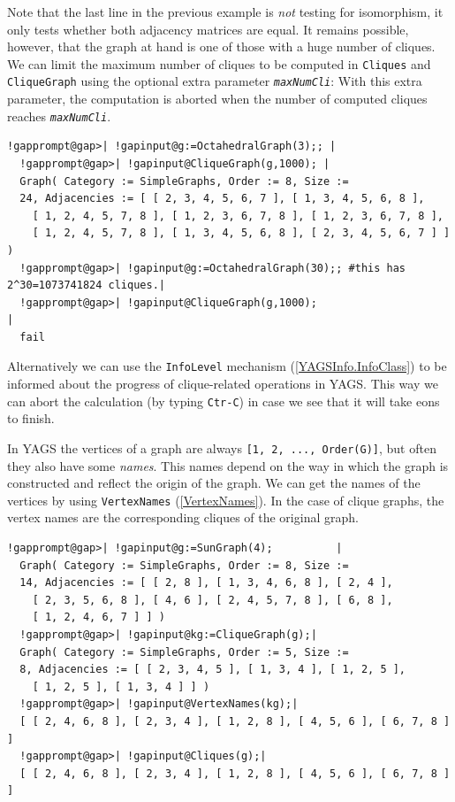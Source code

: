 \documentclass[a4paper,11pt]{report}
\begin{document}
{{Note that the last line in the previous example is \emph{not} testing for isomorphism, it only tests whether both adjacency matrices are
equal. It remains possible, however, that the graph at hand is one of those
with a huge number of cliques. We can limit the maximum number of cliques to
be computed in \texttt{Cliques} and \texttt{CliqueGraph} using the optional extra parameter \mbox{\texttt{\mdseries\slshape maxNumCli}}: With this extra parameter, the computation is aborted when the number of
computed cliques reaches \mbox{\texttt{\mdseries\slshape maxNumCli}}. 

 
\begin{Verbatim}[commandchars=!@|,fontsize=\small,frame=single,label=Example]
  !gapprompt@gap>| !gapinput@g:=OctahedralGraph(3);; |
  !gapprompt@gap>| !gapinput@CliqueGraph(g,1000); |
  Graph( Category := SimpleGraphs, Order := 8, Size := 
  24, Adjacencies := [ [ 2, 3, 4, 5, 6, 7 ], [ 1, 3, 4, 5, 6, 8 ], 
    [ 1, 2, 4, 5, 7, 8 ], [ 1, 2, 3, 6, 7, 8 ], [ 1, 2, 3, 6, 7, 8 ], 
    [ 1, 2, 4, 5, 7, 8 ], [ 1, 3, 4, 5, 6, 8 ], [ 2, 3, 4, 5, 6, 7 ] ] )
  !gapprompt@gap>| !gapinput@g:=OctahedralGraph(30);; #this has 2^30=1073741824 cliques.|
  !gapprompt@gap>| !gapinput@CliqueGraph(g,1000);                            |
  fail
\end{Verbatim}
 

Alternatively we can use the \texttt{InfoLevel} mechanism (\ref{YAGSInfo.InfoClass}) to be informed about the progress of clique-related operations in \textsf{YAGS}. This way we can abort the calculation (by typing \texttt{Ctr-C}) in case we see that it will take eons to finish. 

In \textsf{YAGS} the vertices of a graph are always \texttt{[1, 2, ..., Order(G)]}, but often they also have some \emph{names}. This names depend on the way in which the graph is constructed and reflect
the origin of the graph. We can get the names of the vertices by using \texttt{VertexNames} (\ref{VertexNames}). In the case of clique graphs, the vertex names are the corresponding cliques
of the original graph. 

 
\begin{Verbatim}[commandchars=!@|,fontsize=\small,frame=single,label=Example]
  !gapprompt@gap>| !gapinput@g:=SunGraph(4);          |
  Graph( Category := SimpleGraphs, Order := 8, Size := 
  14, Adjacencies := [ [ 2, 8 ], [ 1, 3, 4, 6, 8 ], [ 2, 4 ], 
    [ 2, 3, 5, 6, 8 ], [ 4, 6 ], [ 2, 4, 5, 7, 8 ], [ 6, 8 ], 
    [ 1, 2, 4, 6, 7 ] ] )
  !gapprompt@gap>| !gapinput@kg:=CliqueGraph(g);|
  Graph( Category := SimpleGraphs, Order := 5, Size := 
  8, Adjacencies := [ [ 2, 3, 4, 5 ], [ 1, 3, 4 ], [ 1, 2, 5 ], 
    [ 1, 2, 5 ], [ 1, 3, 4 ] ] )
  !gapprompt@gap>| !gapinput@VertexNames(kg);|
  [ [ 2, 4, 6, 8 ], [ 2, 3, 4 ], [ 1, 2, 8 ], [ 4, 5, 6 ], [ 6, 7, 8 ] ]
  !gapprompt@gap>| !gapinput@Cliques(g);|
  [ [ 2, 4, 6, 8 ], [ 2, 3, 4 ], [ 1, 2, 8 ], [ 4, 5, 6 ], [ 6, 7, 8 ] ]
\end{Verbatim}
 

}}
\end{document}
